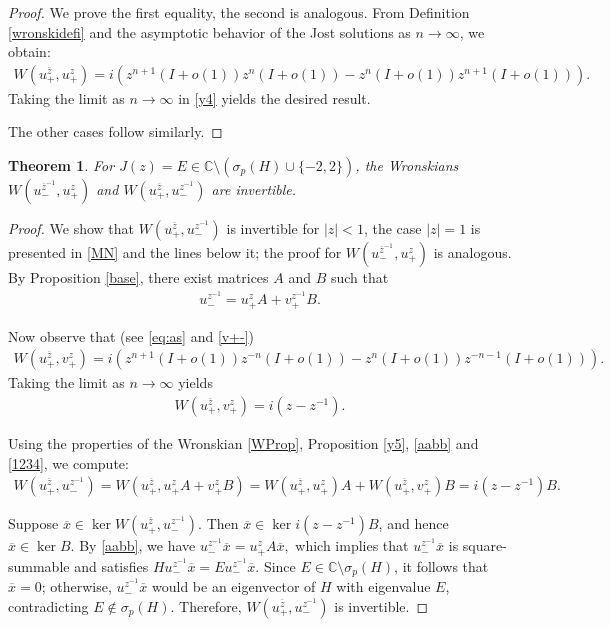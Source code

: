 \documentclass[12pt,oneside,onecolumn,open]{article}
\newtheorem{teo}{Theorem}[section]
\begin{document}
\begin{proof}
We prove the first equality, the second is analogous. From Definition \ref{wronskidefi} and the asymptotic behavior of the Jost solutions as $n \to \infty$, we obtain:
\begin{align}\label{y4}
W(u_{+}^{\overline{z}}, u_{+}^{z}) = i\left(z^{n+1}(I + o(1))z^{n}(I + o(1)) - z^{n}(I + o(1))z^{n+1}(I + o(1))\right).
\end{align}
Taking the limit as $n \to \infty$ in \eqref{y4} yields the desired result.

The other cases follow similarly.
\end{proof}
 \begin{teo} \label{Winvertible}
For $J(z) = E \in \mathbb{C} \setminus ( \sigma_p(H) \cup\{ -2, 2 \}) $, the Wronskians
$ 
W(u_-^{\overline{z}^{-1}}, u_+^{z})$   and  $W(u_+^{\overline{z}}, u_-^{z^{-1}})$ 
are invertible.
\end{teo}

\begin{proof}
We show that $W(u_+^{\overline{z}}, u_-^{z^{-1}})$ is invertible  for $|z|<1$, the case $|z|=1$ is presented in \eqref{MN} and the lines below it; the proof for $W(u_-^{\overline{z}^{-1}}, u_+^{z})$ is analogous. By Proposition \ref{base}, there exist matrices $A$ and $B$ such that 
\begin{align}\label{aabb}
u_-^{z^{-1}} = u_+^{z}A + v_+^{z^{-1}}B.
\end{align}

Now observe that (see \eqref{eq:as} and \eqref{v+-})
\begin{align}
W(u_+^{\overline{z}}, v_+^{z}) = i\left(z^{n+1}(I+o(1))z^{-n}(I+o(1)) - z^{n}(I+o(1))z^{-n-1}(I+o(1))\right).
\end{align}
Taking the limit as $n \to \infty$ yields
\begin{align}\label{1234}
W(u_+^{\overline{z}}, v_+^{z}) = i(z - z^{-1}).
\end{align}

Using the properties of the Wronskian \eqref{WProp}, Proposition \ref{y5}, \eqref{aabb} and \eqref{1234}, we compute:
\begin{align}
W(u_+^{\overline{z}}, u_-^{z^{-1}}) = W(u_+^{\overline{z}}, u_+^{z}A + v_+^{z}B) = W(u_+^{\overline{z}}, u_+^{z})A + W(u_+^{\overline{z}}, v_+^{z})B 
= i(z - z^{-1})B.
\end{align}

Suppose $\overline{x} \in \ker W(u_+^{\overline{z}}, u_-^{z^{-1}})$. Then $\overline{x} \in \ker i(z - z^{-1})B$, and hence $\overline{x} \in \ker B$. By \eqref{aabb}, we have
$ 
u_-^{z^{-1}}\overline{x} = u_+^{z}A\overline{x},
$ 
which implies that $u_-^{z^{-1}}\overline{x}$ is square-summable and satisfies $Hu_-^{z^{-1}}\overline{x} = Eu_-^{z^{-1}}\overline{x}$. Since $E \in \mathbb{C} \setminus \sigma_p(H)$, it follows that $\overline{x} = 0$; otherwise, $u_-^{z^{-1}}\overline{x}$ would be an eigenvector of $H$ with eigenvalue $E$, contradicting $E \notin \sigma _p(H)$. Therefore, $W(u_+^{\overline{z}}, u_-^{z^{-1}})$ is invertible.
\end{proof}        
 
\end{document}
